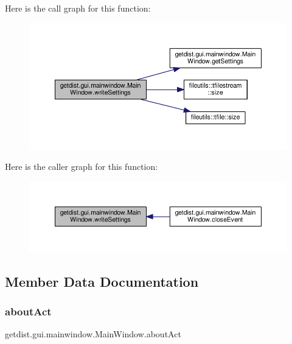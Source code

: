 Here is the call graph for this function\+:
\nopagebreak
\begin{figure}[H]
\begin{center}
\leavevmode
\includegraphics[width=350pt]{classgetdist_1_1gui_1_1mainwindow_1_1MainWindow_ac5712470b76dd04c734584cbc7da1111_cgraph}
\end{center}
\end{figure}
Here is the caller graph for this function\+:
\nopagebreak
\begin{figure}[H]
\begin{center}
\leavevmode
\includegraphics[width=350pt]{classgetdist_1_1gui_1_1mainwindow_1_1MainWindow_ac5712470b76dd04c734584cbc7da1111_icgraph}
\end{center}
\end{figure}


\subsection{Member Data Documentation}
\mbox{\label{classgetdist_1_1gui_1_1mainwindow_1_1MainWindow_a3a80c86f0f1c96a6e09fc2380b8c2b4c}} 
\subsubsection{\texorpdfstring{about\+Act}{aboutAct}}
{\footnotesize\ttfamily getdist.\+gui.\+mainwindow.\+Main\+Window.\+about\+Act}


